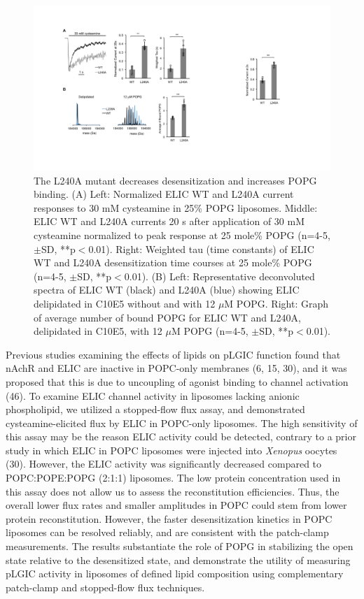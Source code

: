 \begin{figure}
\includegraphics[width=\linewidth]{./pandoc_test/media/image9.pdf}
\caption[The L240A mutant decreases desensitization and increases POPG binding.] {The L240A mutant decreases desensitization and increases POPG binding. (A) Left: Normalized ELIC WT and L240A current responses to 30 mM cysteamine in 25\% POPG liposomes. Middle: ELIC WT and L240A currents 20 s after application of 30 mM cysteamine normalized to peak response at 25 mole\% POPG (n=4-5, $\pm$SD, **p$<$0.01). Right: Weighted tau (time constants) of ELIC WT and L240A desensitization time courses at 25 mole\% POPG (n=4-5, $\pm$SD, **p$<$0.01). (B) Left: Representative deconvoluted spectra of ELIC WT (black) and L240A (blue) showing ELIC delipidated in C10E5 without and with 12 $\mu$M POPG. Right: Graph of average number of bound POPG for ELIC WT and L240A, delipidated in C10E5, with 12 $\mu$M POPG (n=4-5, $\pm$SD, **p$<$0.01).}  \label{fig:ten}
\end{figure}

Previous studies examining the effects of lipids on pLGIC function found
that nAchR and ELIC are inactive in POPC-only membranes (6, 15, 30), and
it was proposed that this is due to uncoupling of agonist binding to
channel activation (46). To examine ELIC channel activity in liposomes
lacking anionic phospholipid, we utilized a stopped-flow flux assay, and
demonstrated cysteamine-elicited flux by ELIC in POPC-only liposomes.
The high sensitivity of this assay may be the reason ELIC activity could
be detected, contrary to a prior study in which ELIC in POPC liposomes
were injected into \textit{Xenopus} oocytes (30). However, the ELIC
activity was significantly decreased compared to POPC:POPE:POPG (2:1:1)
liposomes. The low protein concentration used in this assay does not
allow us to assess the reconstitution efficiencies. Thus, the overall
lower flux rates and smaller amplitudes in POPC could stem from lower
protein reconstitution. However, the faster desensitization kinetics in
POPC liposomes can be resolved reliably, and are consistent with the
patch-clamp measurements. The results substantiate the role of POPG in
stabilizing the open state relative to the desensitized state, and
demonstrate the utility of measuring pLGIC activity in liposomes of
defined lipid composition using complementary
patch-clamp
and stopped-flow flux techniques.

